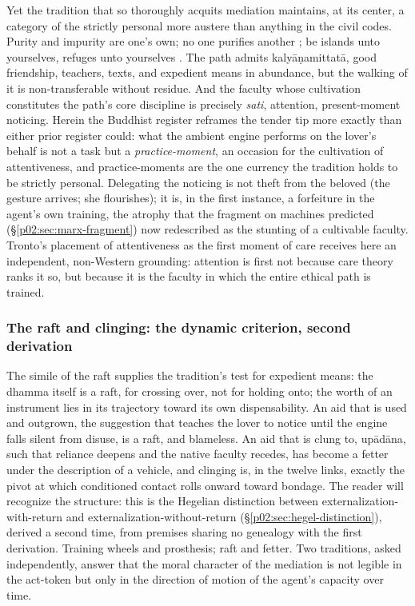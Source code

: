 \documentclass[11pt,a4paper]{article}
\begin{document}
Yet the tradition that so thoroughly acquits mediation maintains, at its center, a category of the strictly personal more austere than anything in the civil codes. Purity and impurity are one's own; no one purifies another \parencite[v.~165]{buddharakkhita1985dhammapada}; be islands unto yourselves, refuges unto yourselves \parencite[DN 16]{walshe1995long}. The path admits kaly\=a\d{n}amittat\=a, good friendship, teachers, texts, and expedient means in abundance, but the walking of it is non-transferable without residue. And the faculty whose cultivation constitutes the path's core discipline is precisely \emph{sati}, attention, present-moment noticing. Herein the Buddhist register reframes the tender tip more exactly than either prior register could: what the ambient engine performs on the lover's behalf is not a task but a \emph{practice-moment}, an occasion for the cultivation of attentiveness, and practice-moments are the one currency the tradition holds to be strictly personal. Delegating the noticing is not theft from the beloved (the gesture arrives; she flourishes); it is, in the first instance, a forfeiture in the agent's own training, the atrophy that the fragment on machines predicted (\S\ref{p02:sec:marx-fragment}) now redescribed as the stunting of a cultivable faculty. Tronto's placement of attentiveness as the first moment of care \parencite{tronto1993moral} receives here an independent, non-Western grounding: attention is first not because care theory ranks it so, but because it is the faculty in which the entire ethical path is trained.

\subsubsection{The raft and clinging: the dynamic criterion, second derivation}
\label{p02:sec:buddhism-raft}

The simile of the raft \parencite[MN 22]{nanamoli1995middle} supplies the tradition's test for expedient means: the dhamma itself is a raft, for crossing over, not for holding onto; the worth of an instrument lies in its trajectory toward its own dispensability. An aid that is used and outgrown, the suggestion that teaches the lover to notice until the engine falls silent from disuse, is a raft, and blameless. An aid that is clung to, up\=ad\=ana, such that reliance deepens and the native faculty recedes, has become a fetter under the description of a vehicle, and clinging is, in the twelve links, exactly the pivot at which conditioned contact rolls onward toward bondage. The reader will recognize the structure: this is the Hegelian distinction between externalization-with-return and externalization-without-return (\S\ref{p02:sec:hegel-distinction}), derived a second time, from premises sharing no genealogy with the first derivation. Training wheels and prosthesis; raft and fetter. Two traditions, asked independently, answer that the moral character of the mediation is not legible in the act-token but only in the direction of motion of the agent's capacity over time.
\end{document}
